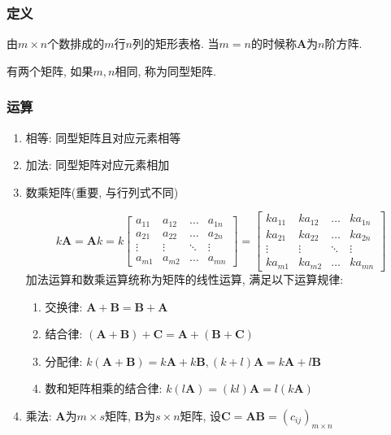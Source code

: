 \subsubsection{定义}
由$ m\times n $个数排成的$ m $行$ n $列的矩形表格. 当$ m=n $的时候称$ \bm{A} $为$ n $阶方阵.\par 有两个矩阵, 如果$ m,n $相同, 称为同型矩阵.
\subsubsection{运算}
\begin{enumerate}
	\item 相等: 同型矩阵且对应元素相等
	\item 加法: 同型矩阵对应元素相加
	\item 数乘矩阵(重要, 与行列式不同)\par 
	\begin{equation*}
		k\bm{A} = \bm{A}k = k \begin{bmatrix}
		a_{11}	& a_{12}  & \dots & a_{1n} \\
		a_{21}	& a_{22} & \dots & a_{2n} \\
		\vdots	& \vdots & \ddots & \vdots \\
		a_{m1}	& a_{m2} & \dots & a_{mn} 
		\end{bmatrix} = 
	    \begin{bmatrix}
	    ka_{11}	& ka_{12}  & \dots & ka_{1n} \\
	    ka_{21}	& ka_{22} & \dots & ka_{2n} \\
	    \vdots	& \vdots & \ddots & \vdots \\
	    ka_{m1}	& ka_{m2} & \dots & ka_{mn} 
	    \end{bmatrix}
	\end{equation*}
    加法运算和数乘运算统称为矩阵的线性运算, 满足以下运算规律:
    \begin{enumerate}
	\item 交换律: $ \bm{A}+\bm{B}=\bm{B}+\bm{A} $
	\item 结合律: $ (\bm{A}+\bm{B})+\bm{C}=\bm{A}+(\bm{B}+\bm{C}) $
	\item 分配律: $ k(\bm{A}+\bm{B})=k\bm{A}+k\bm{B}, (k+l)\bm{A}=k\bm{A}+l\bm{B} $
	\item 数和矩阵相乘的结合律: $ k(l\bm{A})=(kl)\bm{A}=l(k\bm{A}) $
    \end{enumerate}
    \item 乘法: $ \bm{A} $为$ m\times s $矩阵, $ \bm{B} $为$ s\times n $矩阵, 设$ \bm{C}=\bm{A}\bm{B}=(c_{ij})_{m\times n} $
    \begin{equation*}

\end{equation*}
\end{enumerate}
